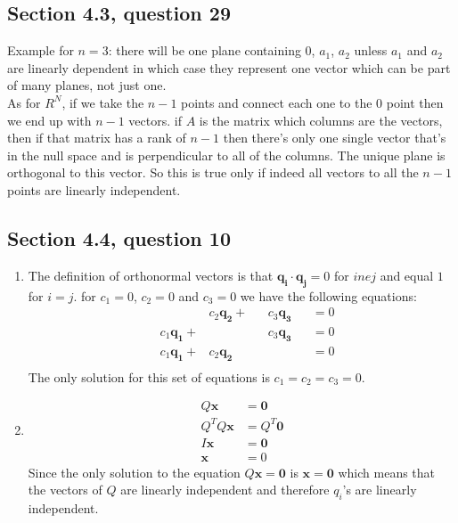 \documentclass[a4paper,11pt]{article}
\newcommand{\mybf}[1]{\boldsymbol{#1}}
\begin{document}
\subsection*{Section 4.3, question 29}
Example for $n=3$: there will be one plane containing $0$, $a_1$, $a_2$ unless $a_1$ and $a_2$ are linearly dependent in which case they represent one vector  which can be part of many planes, not just one.\\
As for $R^N$, if we take the $n-1$ points and connect each one to the 0 point then we end up with $n-1$ vectors. if $A$ is the matrix which columns are the vectors, then if that matrix has a rank of $n-1$ then there's only one single vector that's in the null space and is perpendicular to all of the columns. The unique plane is orthogonal to this vector. So this is true only if indeed all vectors to all the $n-1$ points are linearly independent. 
\subsection*{Section 4.4, question 10}
\begin{enumerate}
\item The definition of orthonormal vectors is that $\mybf{q_i}\cdot\mybf{q_j}=0$ for $i ne j$ and equal $1$ for $i=j$.
for $c_1=0$, $c_2=0$ and $c_3=0$ we have the following equations:
\begin{align*}
&&c_2\mybf{q_2}+&&c_3\mybf{q_3}&&=0\\
&c_1\mybf{q_1}+&&&c_3\mybf{q_3}&&=0\\
&c_1\mybf{q_1}+&c_2\mybf{q_2}&&&&=0\\
\end{align*}
The only solution for this set of equations is $c_1=c_2=c_3=0$.
\item 
\begin{align*}
Q\mybf{x}&=\mybf{0} \\
Q^TQ\mybf{x}&=Q^T\mybf{0} \\
I\mybf{x}&=\mybf{0} \\
\mybf{x}&=0
\end{align*}
Since the only solution to the equation $Q\mybf{x}=\mybf{0}$ is $\mybf{x}=\mybf{0}$ which means that the vectors of $Q$ are linearly independent and therefore $q_i$'s are linearly independent.
\end{enumerate}
\end{document}
